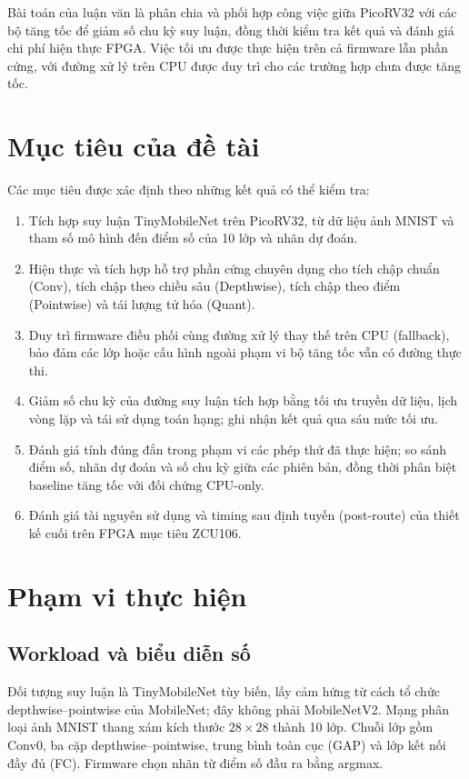 Bài toán của luận văn là phân chia và phối hợp công việc giữa PicoRV32 với các bộ tăng tốc để giảm số chu kỳ suy luận, đồng thời kiểm tra kết quả và đánh giá chi phí hiện thực FPGA. Việc tối ưu được thực hiện trên cả firmware lẫn phần cứng, với đường xử lý trên CPU được duy trì cho các trường hợp chưa được tăng tốc.

\section{Mục tiêu của đề tài}
Các mục tiêu được xác định theo những kết quả có thể kiểm tra:
\begin{enumerate}
    \item Tích hợp suy luận TinyMobileNet trên PicoRV32, từ dữ liệu ảnh MNIST và tham số mô hình đến điểm số của 10 lớp và nhãn dự đoán.
    \item Hiện thực và tích hợp hỗ trợ phần cứng chuyên dụng cho tích chập chuẩn (Conv), tích chập theo chiều sâu (Depthwise), tích chập theo điểm (Pointwise) và tái lượng tử hóa (Quant).
    \item Duy trì firmware điều phối cùng đường xử lý thay thế trên CPU (fallback), bảo đảm các lớp hoặc cấu hình ngoài phạm vi bộ tăng tốc vẫn có đường thực thi.
    \item Giảm số chu kỳ của đường suy luận tích hợp bằng tối ưu truyền dữ liệu, lịch vòng lặp và tái sử dụng toán hạng; ghi nhận kết quả qua sáu mức tối ưu.
    \item Đánh giá tính đúng đắn trong phạm vi các phép thử đã thực hiện; so sánh điểm số, nhãn dự đoán và số chu kỳ giữa các phiên bản, đồng thời phân biệt baseline tăng tốc với đối chứng CPU-only.
    \item Đánh giá tài nguyên sử dụng và timing sau định tuyến (post-route) của thiết kế cuối trên FPGA mục tiêu ZCU106.
\end{enumerate}

\section{Phạm vi thực hiện}
\subsection{Workload và biểu diễn số}
Đối tượng suy luận là TinyMobileNet tùy biến, lấy cảm hứng từ cách tổ chức depthwise--pointwise của MobileNet; đây không phải MobileNetV2. Mạng phân loại ảnh MNIST thang xám kích thước $28\times28$ thành 10 lớp. Chuỗi lớp gồm Conv0, ba cặp depthwise--pointwise, trung bình toàn cục (GAP) và lớp kết nối đầy đủ (FC). Firmware chọn nhãn từ điểm số đầu ra bằng argmax.

